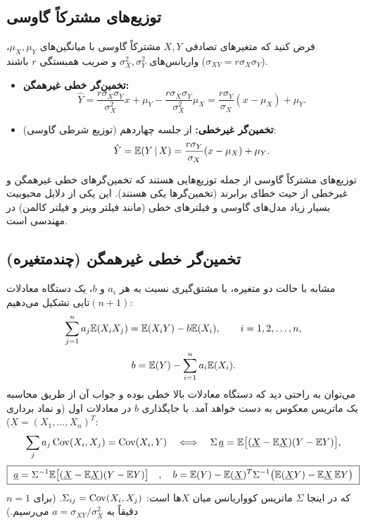 \subsection{توزیع‌های مشترکاً گاوسی}
فرض کنید که متغیرهای تصادفی $X,Y$ مشترکاً گاوسی با میانگین‌های $\mu_X,\mu_Y$، واریانس‌های $\sigma_X^2,\sigma_Y^2$ و ضریب همبستگی $r$ باشند ($\sigma_{XY}=r\sigma_X\sigma_Y$).
\begin{itemize}
\item \textbf{تخمین‌گر  خطی غیرهمگن:}
\[
\hat Y=\frac{r\sigma_X\sigma_Y}{\sigma_X^2}x+\mu_Y-\frac{r\sigma_X\sigma_Y}{\sigma_X^2}\mu_X=\frac{r\sigma_Y}{\sigma_X}(x-\mu_X)+\mu_Y .
\]
\item \textbf{تخمین‌گر  غیرخطی:} از جلسه چهاردهم (توزیع شرطی گاوسی):
\[
\hat Y=\mathbb{E}(Y\,|\, X)=\frac{r\sigma_Y}{\sigma_X}(x-\mu_X)+\mu_Y .
\]
\end{itemize}
توزیع‌های مشترکاً گاوسی از جمله توزیع‌هایی هستند که تخمین‌گرهای خطی غیرهمگن و غیرخطی از حیث خطای  برابرند (تخمین‌گرها یکی هستند). این یکی از دلایل محبوبیت بسیار زیاد مدل‌های گاوسی و فیلترهای خطی (مانند فیلتر وینر و فیلتر کالمن) در مهندسی است.

\subsection{تخمین‌گر  خطی غیرهمگن (چندمتغیره)}
\begin{question}[{متغیرهای تصادفی $X_1,\ldots,X_n,Y$ با چگالی مشترک معلوم را در نظر بگیرید. می‌خواهیم $Y$ را به شکل $\hat Y=a_1X_1+\cdots+a_nX_n+b$ تخمین بزنیم به طوری که $\E[(Y-a_1X_1-\cdots-a_nX_n-b)^2]$ کمینه شود. ضرایب را بیابید.}]
\begin{answer}
مشابه با حالت دو متغیره، با مشتق‌گیری نسبت به هر $a_i$ و $b$، یک دستگاه معادلات $(n+1)$تایی تشکیل می‌دهیم:
\[
\sum_{j=1}^{n}a_j\mathbb{E}(X_iX_j)=\mathbb{E}(X_iY)-b\mathbb{E}(X_i),\qquad i=1,2,\ldots,n,
\]
\[
b=\mathbb{E}(Y)-\sum_{i=1}^{n}a_i\mathbb{E}(X_i).
\]
می‌توان به راحتی دید که دستگاه معادلات بالا خطی بوده و جواب آن از طریق محاسبه یک ماتریس معکوس به دست خواهد آمد. با جایگذاری $b$ در معادلات اول (و نماد برداری $\underline X=(X_1,\ldots,X_n)^T$):
\[
\sum_ja_j\operatorname{Cov}(X_i,X_j)=\operatorname{Cov}(X_i,Y)\quad\Longleftrightarrow\quad\Sigma\,\underline a=\mathbb{E}\big[(\underline X-\mathbb{E}\underline X)(Y-\mathbb{E} Y)\big],
\]
\[
\boxed{\ \underline a=\Sigma^{-1}\E\big[(\underline X-\E\underline X)(Y-\E Y)\big]\quad,\quad b=\E(Y)-\E(\underline X)^T\Sigma^{-1}\big(\E(\underline XY)-\E\underline X\,\E Y\big)\ }
\]
که در اینجا $\Sigma$ ماتریس کوواریانس میان $X$ها است: $\Sigma_{ij}=\operatorname{Cov}(X_i,X_j)$. (برای $n=1$ دقیقاً به $a=\sigma_{XY}/\sigma_X^2$ می‌رسیم.)
\end{answer}
\end{question}

